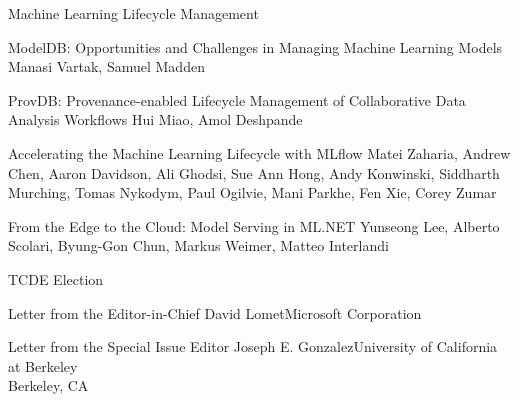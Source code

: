 \documentclass[11pt]{article}
\begin{document}
\begin{bulletin}
\begin{articlesection}{Machine Learning Lifecycle Management}
\begin{article}
{{\sc ModelDB}: Opportunities and Challenges in Managing Machine Learning Models}
{Manasi Vartak, Samuel Madden}
\graphicspath{{submissions/DEB-ModelDB/figs/}}

\end{article}


\begin{article}
{{ProvDB:} Provenance-enabled Lifecycle Management of Collaborative Data Analysis Workflows}
{Hui Miao, Amol Deshpande}
\graphicspath{{submissions/ProvDB/figs/}}

\end{article}


\begin{article}
{Accelerating the Machine Learning Lifecycle with {MLflow}}
{Matei Zaharia, Andrew Chen, Aaron Davidson, Ali Ghodsi, Sue Ann Hong, Andy Konwinski, Siddharth Murching, Tomas Nykodym, Paul Ogilvie, Mani Parkhe, Fen Xie, Corey Zumar}
\graphicspath{{submissions/mlflow/}}

\end{article}



\begin{article}
{From the Edge to the Cloud: Model Serving in ML.NET}
{Yunseong Lee, Alberto Scolari, Byung-Gon Chun, Markus Weimer, Matteo Interlandi}
\graphicspath{{submissions/model_serving_dot_net/figs/}}

\end{article}



\end{articlesection}

\begin{newssection}{TCDE Election}


\begin{news}{Letter from the Editor-in-Chief}
{David Lomet}{Microsoft Corporation}

\end{news}
%
\newpage
%
%
\begin{news}{Letter from the Special Issue Editor}
{Joseph E. Gonzalez}{University of California at Berkeley\\ Berkeley, CA}

\end{news}



\end{newssection}
\end{bulletin}
\end{document}
